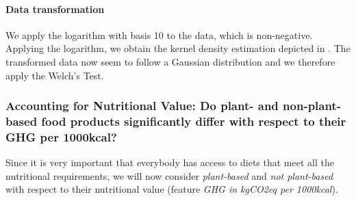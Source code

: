 \documentclass{article}
\begin{document}
\paragraph*{Data transformation}
We apply the logarithm with basis 10 to the data, which is non-negative. Applying the logarithm, we obtain the kernel density estimation depicted in .
The transformed data now seem to follow a  Gaussian distribution and we therefore apply the Welch's Test.

\subsubsection*{Accounting  for Nutritional Value: Do plant- and non-plant-based food products significantly differ with respect to their GHG per 1000kcal?}

Since it is very important that everybody has access to diets that meet all the nutritional requirements, we will now consider \textit{plant-based} and \textit{not plant-based} with respect to their nutritional value (feature \textit{GHG in kgCO2eq per 1000kcal}).
\end{document}
